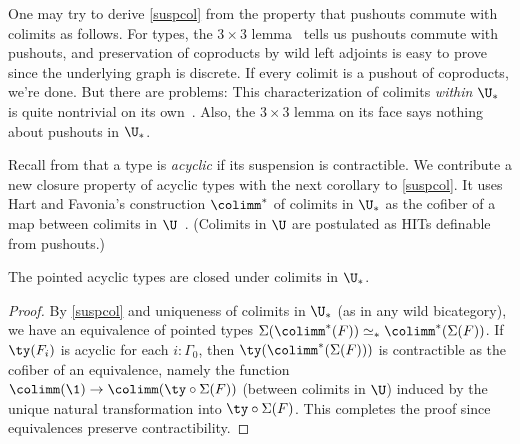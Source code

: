 \begin{rem}
One may try to derive \autoref{suspcol} from the property that pushouts commute with colimits as follows. For types, the $3\times 3$ lemma~\cite[Section VII]{3x3} tells us pushouts commute with pushouts, and preservation of coproducts by wild left adjoints is easy to prove since the underlying graph is discrete. If every colimit is a pushout of coproducts, we're done. But there are problems: This characterization of colimits \emph{within $\U_{\ast}$} is quite nontrivial on its own~\cite[Section 8.1]{CSL25}. Also, the $3\times 3$ lemma on its face says nothing about pushouts in $\U_{\ast}$.
\end{rem}

Recall from \cite{acyclic} that a type is \emph{acyclic} if its suspension is contractible. We contribute a new closure property of acyclic types with the next corollary to \autoref{suspcol}. It uses Hart and Favonia's construction $\colimm^{\ast}$ of colimits in $\U_{\ast}$ as the cofiber of a map between colimits in $\U$~\cite[Theorem 15]{CSL25}. (Colimits in $\U$ are postulated as HITs definable from pushouts.)
\begin{cor} 
The pointed acyclic types are closed under colimits in $\U_{\ast}$.
\end{cor}
\begin{proof}
By \autoref{suspcol} and uniqueness of colimits in $\U_{\ast}$ (as in any wild bicategory), we have an equivalence of pointed types $\Sigma(\colimm^{\ast}(F)) \simeq_{\ast} \colimm^{\ast}(\Sigma(F))$. If $\ty(F_i)$ is acyclic for each $i : \Gamma_0$, then $\ty(\colimm^{\ast}(\Sigma(F)))$ is contractible as the cofiber of an equivalence, namely the function $\colimm(\1) \to \colimm(\ty \circ \Sigma(F))$ (between colimits in $\U$) induced by the unique natural transformation into $\ty \circ \Sigma(F)$. This completes the proof since equivalences preserve contractibility.
\end{proof}


